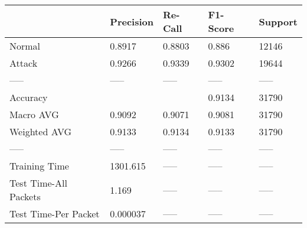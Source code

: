 \begin{tabular}{lllll}
\toprule
{} & Precision & Re-Call & F1-Score & Support \\
\midrule
Normal                &    0.8917 &  0.8803 &    0.886 &   12146 \\
Attack                &    0.9266 &  0.9339 &   0.9302 &   19644 \\
-----                 &     ----- &   ----- &    ----- &   ----- \\
Accuracy              &           &         &   0.9134 &   31790 \\
Macro AVG             &    0.9092 &  0.9071 &   0.9081 &   31790 \\
Weighted AVG          &    0.9133 &  0.9134 &   0.9133 &   31790 \\
-----                 &     ----- &   ----- &    ----- &   ----- \\
Training Time         &  1301.615 &   ----- &    ----- &   ----- \\
Test Time-All Packets &     1.169 &   ----- &    ----- &   ----- \\
Test Time-Per Packet  &  0.000037 &   ----- &    ----- &   ----- \\
\bottomrule
\end{tabular}
